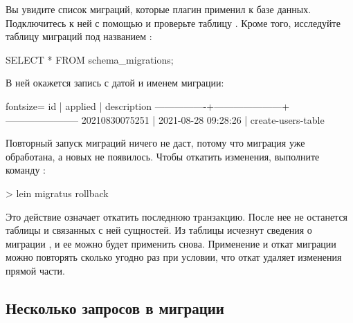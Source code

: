 Вы увидите список миграций, которые плагин применил к базе данных. Подключитесь к ней с помощью  и проверьте таблицу . Кроме того, исследуйте таблицу миграций под названием :

\begin{english}
  \begin{clojure}
SELECT * FROM schema_migrations;
  \end{clojure}
\end{english}

В ней окажется запись с датой и именем миграции:


\begin{english}
  \begin{text*}{fontsize=\small}
         id     |       applied       |      description
----------------+---------------------+-----------------------
 20210830075251 | 2021-08-28 09:28:26 | create-users-table
  \end{text*}
\end{english}

Повторный запуск миграций ничего не даст, потому что миграция  уже обработана, а новых не появилось. Чтобы откатить изменения, выполните команду :

\begin{english}
  \begin{clojure}
> lein migratus rollback
  \end{clojure}
\end{english}

Это действие означает откатить последнюю транзакцию. После нее не останется таблицы  и связанных с ней сущностей. Из таблицы  исчезнут сведения о миграции , и ее можно будет применить снова. Применение и откат миграции можно повторять сколько угодно раз при условии, что откат удаляет изменения прямой части.

\subsection{Несколько запросов в миграции}

